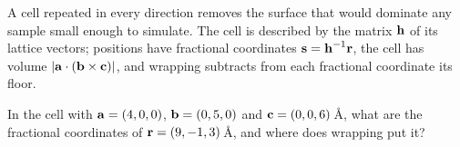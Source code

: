 \begin{keyidea}
A cell repeated in every direction removes the surface that would
dominate any sample small enough to simulate. The cell is described by
the matrix $\bm{\mathrm{h}}$ of its lattice vectors; positions have fractional
coordinates $\bm{\mathrm{s}} = \bm{\mathrm{h}}^{-1}\bm{\mathrm{r}}$, the cell has volume $\lvert
\bm{\mathrm{a}}\cdot(\bm{\mathrm{b}}\times\bm{\mathrm{c}})\rvert$, and wrapping subtracts from
each fractional coordinate its floor.
\end{keyidea}


\begin{selfcheck}
In the cell with $\bm{\mathrm{a}} = (4, 0, 0)$, $\bm{\mathrm{b}} = (0, 5, 0)$ and $\bm{\mathrm{c}} =
(0, 0, 6)$\,\AA, what are the fractional coordinates of $\bm{\mathrm{r}} = (9,
-1, 3)$\,\AA, and where does wrapping put it?
\end{selfcheck}
